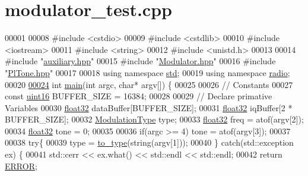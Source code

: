\hypertarget{modulator__test_8cpp_source}{\section{modulator\+\_\+test.\+cpp}
\label{modulator__test_8cpp_source}
}

\begin{DoxyCode}
00001 
00008 \textcolor{preprocessor}{#include <cstdio>}
00009 \textcolor{preprocessor}{#include <cstdlib>}
00010 \textcolor{preprocessor}{#include <iostream>}
00011 \textcolor{preprocessor}{#include <string>}
00012 \textcolor{preprocessor}{#include <unistd.h>}
00013 
00014 \textcolor{preprocessor}{#include "\hyperlink{auxiliary_8hpp}{auxiliary.hpp}"}
00015 \textcolor{preprocessor}{#include "\hyperlink{Modulator_8hpp}{Modulator.hpp}"}
00016 \textcolor{preprocessor}{#include "\hyperlink{PlTone_8hpp}{PlTone.hpp}"}
00017 
00018 \textcolor{keyword}{using namespace }\hyperlink{namespacestd}{std};
00019 \textcolor{keyword}{using namespace }\hyperlink{namespaceradio}{radio};
00020 
\hypertarget{modulator__test_8cpp_source_l00024}{}\hyperlink{modulator__test_8cpp_a0ddf1224851353fc92bfbff6f499fa97}{00024} \textcolor{keywordtype}{int} \hyperlink{modulator__test_8cpp_a0ddf1224851353fc92bfbff6f499fa97}{main}(\textcolor{keywordtype}{int} argc, \textcolor{keywordtype}{char}* argv[]) \{
00025 
00026     \textcolor{comment}{// Constants}
00027     \textcolor{keyword}{const} \hyperlink{definitions_8hpp_a05f6b0ae8f6a6e135b0e290c25fe0e4e}{uint16} BUFFER\_SIZE = 16384;
00028 
00029     \textcolor{comment}{// Declare primative Variables}
00030     \hyperlink{definitions_8hpp_aacdc525d6f7bddb3ae95d5c311bd06a1}{float32} dataBuffer[BUFFER\_SIZE];
00031     \hyperlink{definitions_8hpp_aacdc525d6f7bddb3ae95d5c311bd06a1}{float32} iqBuffer[2 * BUFFER\_SIZE];
00032     \hyperlink{namespaceradio_a46fb7299001138f28b7f69975c58399e}{ModulationType} type;
00033     \hyperlink{definitions_8hpp_aacdc525d6f7bddb3ae95d5c311bd06a1}{float32} freq = atof(argv[2]);
00034     \hyperlink{definitions_8hpp_aacdc525d6f7bddb3ae95d5c311bd06a1}{float32} tone = 0;
00035 
00036     \textcolor{keywordflow}{if}(argc >= 4) tone = atof(argv[3]);
00037 
00038     \textcolor{keywordflow}{try}\{
00039         type = \hyperlink{namespaceradio_a402fe28e2e2bb2be7a0d2d9f74cc640d}{to\_type}(\textcolor{keywordtype}{string}(argv[1]));
00040     \} \textcolor{keywordflow}{catch}(std::exception ex) \{
00041         std::cerr << ex.what() << std::endl << std::endl;
00042         \textcolor{keywordflow}{return} \hyperlink{definitions_8hpp_a8fe83ac76edc595f6b98cd4a4127aed5}{ERROR};

\end{DoxyCode}
